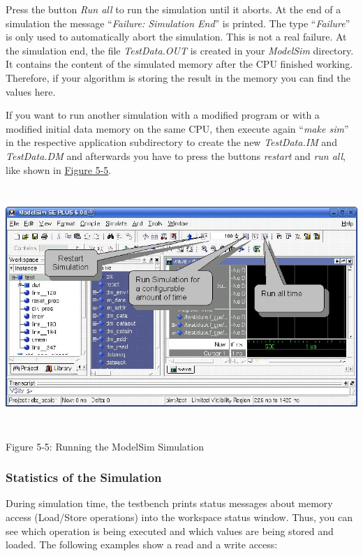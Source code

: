 \documentclass[
]{article}
\begin{document}
Press the button \emph{Run all} to run the simulation until it aborts.
At the end of a simulation the message ``\emph{Failure: Simulation
End}'' is printed. The type ``\emph{Failure}'' is only used to
automatically abort the simulation. This is not a real failure. At the
simulation end, the file \emph{TestData.OUT} is created in your
\emph{ModelSim} directory. It contains the content of the simulated
memory after the CPU finished working. Therefore, if your algorithm is
storing the result in the memory you can find the values here.

If you want to run another simulation with a modified program or with a
modified initial data memory on the same CPU, then execute again
``\emph{make sim}'' in the respective application subdirectory to create
the new \emph{TestData.IM} and \emph{TestData.DM} and afterwards you
have to press the buttons \emph{restart} and \emph{run all}, like shown
in \protect\hyperlink{Fig55}{Figure 5-5}.

\includegraphics[width=6.29097in,height=3.58125in]{5-5.png}

Figure 5‑5:\protect\hypertarget{Fig55}{}{} Running the ModelSim
Simulation

\hypertarget{statistics-of-the-simulation}{%
\subsubsection{Statistics of the
Simulation}\label{statistics-of-the-simulation}}

During simulation time, the testbench prints status messages about
memory access (Load/Store operations) into the workspace status window.
Thus, you can see which operation is being executed and which values are
being stored and loaded. The following examples show a read and a write
access:
\end{document}
